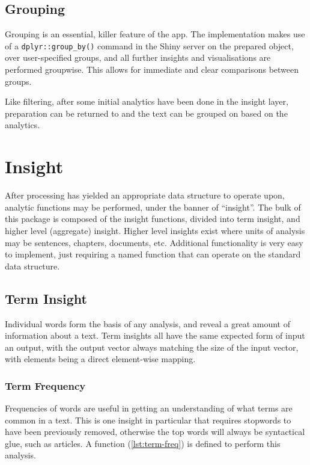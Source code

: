 \message{ !name(jason-cairns-dissertation.tex)}\documentclass[11pt, a4paper, titlepage]{report}
\begin{document}
\subsection{Grouping}

Grouping is an essential, killer feature of the app. The
implementation makes use of a \texttt{dplyr::group_by()}
command in the Shiny server on the prepared object, over
user-specified groups, and all further insights and visualisations are
performed groupwise. This allows for immediate and clear comparisons
between groups.

Like filtering, after some initial analytics have been done in the
insight layer, preparation can be returned to and the text can be
grouped on based on the analytics.

\section{Insight}\label{sec:insight}

After processing has yielded an appropriate data structure to operate
upon, analytic functions may be performed, under the banner of
``insight''. The bulk of this package is composed of the insight
functions, divided into term insight, and higher level (aggregate)
insight. Higher level insights exist where units of analysis may be
sentences, chapters, documents, etc. Additional functionality is very
easy to implement, just requiring a named function that can operate on
the standard data structure.

\subsection{Term Insight}\label{sec:term-insight}

Individual words form the basis of any analysis, and reveal a great
amount of information about a text. Term insights all have the same
expected form of input an output, with the output vector always
matching the size of the input vector, with elements being a direct
element-wise mapping.

\subsubsection{Term Frequency}\label{sec:term-frequency}

Frequencies of words are useful in getting an understanding of what
terms are common in a text. This is one insight in particular that
requires stopwords to have been previously removed, otherwise the top
words will always be syntactical glue, such as articles. A function
(\cref{lst:term-freq}) is defined to perform this analysis.
\end{document}

